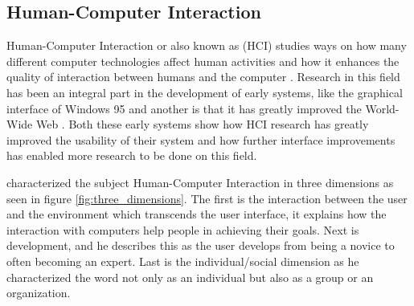 
%

\subsection{Human-Computer Interaction}
Human-Computer Interaction or also known as (HCI) studies ways on how many different computer technologies affect human activities \cite{dix2009human} and how it enhances the quality of interaction between humans and the computer \cite{baecker2014readings}. Research in this field has been an integral part in the development of early systems, like the graphical interface of Windows 95 and another is that it has greatly improved the World-Wide Web \cite{myers1998brief}. Both these early systems show how HCI research has greatly improved the usability of their system and how further interface improvements has enabled more research to be done on this field. 

\citeauthor{kaptelinin1996activity} characterized the subject Human-Computer Interaction in three dimensions as seen in figure \ref{fig:three_dimensions}. The first is the interaction between the user and the environment which transcends the user interface, it explains how the interaction with computers help people in achieving their goals. Next is development, and he describes this as the user develops from being a novice to often becoming an expert. Last is the individual/social dimension as he characterized the word  not only as an individual but also as a group or an organization.

